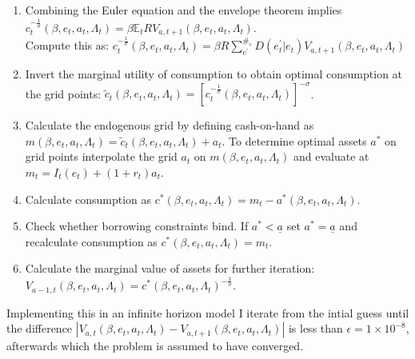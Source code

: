 \begin{enumerate}
    \item Combining the Euler equation and the envelope theorem implies $c_{t}^{-\frac{1}{\sigma}}\left(\beta,e_{t},a_{t},\Lambda_{t}\right)=\beta\mathbb{E}_{t}RV_{a,t+1}\left(\beta,e_{t},a_{t},\Lambda_{t}\right)$.\\ Compute this as: $c_{t}^{-\frac{1}{\sigma}}\left(\beta,e_{t},a_{t},\Lambda_{t}\right)=\beta R\sum_{e^{'}}^{\#_{e}}D\left(e_{t}^{'}\left|e_{t}\right.\right)V_{a,t+1}\left(\beta,e_{t},a_{t},\Lambda_{t}\right)$
    
    \item Invert the marginal utility of consumption to obtain optimal consumption at the grid points: $\tilde{c}_{t}\left(\beta,e_{t},a_{t},\Lambda_{t}\right)=\left[c_{t}^{-\frac{1}{\sigma}}\left(\beta,e_{t},a_{t},\Lambda_{t}\right)\right]^{-\sigma}$.
    \item Calculate the endogenous grid by defining cash-on-hand as $m\left(\beta,e_{t},a_{t},\Lambda_{t}\right)=\tilde{c}_{t}\left(\beta,e_{t},a_{t},\Lambda_{t}\right)+a_{t}$. To determine optimal assets $a^{*}$ on grid points interpolate the grid $a_t$ on $m\left(\beta,e_{t},a_{t},\Lambda_{t}\right)$ and evaluate at $m_{t}=I_{t}\left(e_{t}\right)+\left(1+r_{t}\right)a_{t}$.  
    \item Calculate consumption as $c^{*}\left(\beta,e_{t},a_{t},\Lambda_{t}\right)=m_{t}-a^{*}\left(\beta,e_{t},a_{t},\Lambda_{t}\right)$.
    \item Check whether borrowing constraints bind. If $a^{*}<\underline{a}$ set $a^{*}=\underline{a}$ and recalculate consumption as $c^{*}\left(\beta,e_{t},a_{t},\Lambda_{t}\right)=m_{t}$. 
    \item Calculate the marginal value of assets for further iteration: $V_{a-1,t}\left(\beta,e_{t},a_{t},\Lambda_{t}\right)=c^{*}\left(\beta,e_{t},a_{t},\Lambda_{t}\right)^{-\frac{1}{\sigma}}$. 
\end{enumerate}
Implementing this in an infinite horizon model I iterate from the intial guess until the difference $\left|V_{a,t}\left(\beta,e_{t},a_{t},\Lambda_{t}\right)-V_{a,t+1}\left(\beta,e_{t},a_{t},\Lambda_{t}\right)\right|$ is less than $\epsilon=1\times10^{-8}$, afterwards which the problem is assumed to have converged.  \\

